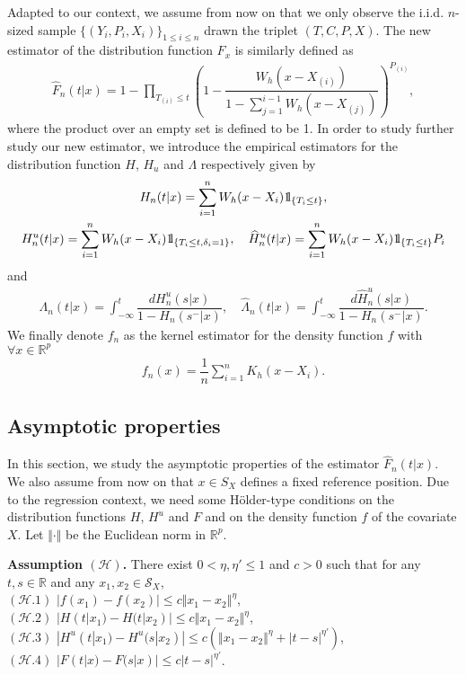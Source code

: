\documentclass[12pt]{article}
\def\ind{ {{\rm 1}\hskip-2.2pt{\rm l}}}
\begin{document}
\noindent
Adapted to our context, we assume from now on that we only observe the i.i.d. $n$-sized sample $\{(Y_i,P_i,X_i)\}_{1\leq i\leq n}$ drawn the triplet $(T,C,P,X)$. The new estimator of the distribution function $F_x$ is similarly defined as 
\begin{eqnarray*}
\widehat{F}_n(t|x)=1-\prod_{T_{(i)}\leq t}\left(1-\dfrac{W_h(x-X_{(i)})}{1-\sum_{j=1}^{i-1}W_h(x-X_{(j)})}\right)^{P_{(i)}},
\end{eqnarray*}
where the product over an empty set is defined to be 1. In order to study further study our new estimator, we introduce the empirical estimators for the distribution function $H$, $H_u$ and $\Lambda$ respectively given by
\begin{gather*}
H_n(t|x)=\sum_{i=1}^nW_h(x-X_i)\ind_{\{T_i\leq t\}},\\
H_n^u(t|x)=\sum_{i=1}^nW_h(x-X_i)\ind_{\{T_i\leq t,\delta_i=1\}},\quad \widehat{H}_n^u(t|x)=\sum_{i=1}^nW_h(x-X_i)\ind_{\{T_i\leq t\}}P_i
\end{gather*}
and
\begin{eqnarray*}
\Lambda_n(t|x) = \int_{-\infty}^t\dfrac{dH_n^u(s|x)}{1-H_n(s^-|x)},\quad\widehat{\Lambda}_n(t|x) = \int_{-\infty}^t\dfrac{d\widehat{H}_n^u(s|x)}{1-H_n(s^-|x)}.
\end{eqnarray*}
We finally denote $f_n$ as the kernel estimator for the density function $f$ with $\forall x\in\mathbb{R}^p$
\begin{eqnarray*}
f_n(x)=\dfrac{1}{n}\sum_{i=1}^nK_h(x-X_i).
\end{eqnarray*}

\subsection{Asymptotic properties}

In this section, we study the asymptotic properties of the estimator $\widehat{F}_n(t|x)$. We also assume from now on that $x\in S_X$ defines a fixed reference position. Due to the regression context, we need some H\"older-type conditions on the distribution functions $H$, $H^u$ and $F$ and on the density function $f$ of the covariate $X$. Let $\Vert \cdot \Vert$ be the Euclidean norm in $\mathbb{R}^p$.

\medskip

\noindent
{\bf Assumption $(\mathcal{H})$.} There exist $0<\eta,\eta' \le 1$ and $c>0$ such that for any $t,s \in\mathbb{R}$ and any $x_1,x_2\in\mathcal{S}_X$,  \\
$(\mathcal{H}.1)$ $|f(x_1)-f(x_2)|\leq c\Vert x_1-x_2\Vert^\eta$, \\
$(\mathcal{H}.2)$ $|H(t|x_1)-H(t|x_2)|\leq c\Vert x_1-x_2\Vert^\eta$, \\
$(\mathcal{H}.3)$ $|H^u(t|x_1)-H^u(s|x_2)|\leq c(\Vert x_1-x_2\Vert^\eta+|t-s|^{\eta'})$, \\
$(\mathcal{H}.4)$ $|F(t|x)-F(s|x)|\leq c|t-s|^{\eta'}$.\\
\end{document}
